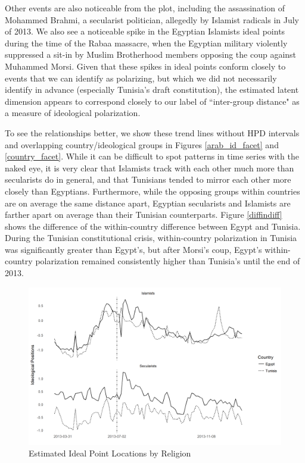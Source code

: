 \documentclass[12pt]{article}
\begin{document}
Other events are also noticeable from the plot, including the assassination of Mohammed Brahmi, a secularist politician, allegedly by Islamist radicals in July of 2013. We also see a noticeable spike in the Egyptian Islamists ideal points during the time of the Rabaa massacre, when the Egyptian military violently suppressed a sit-in by Muslim Brotherhood members opposing the coup against Muhammed Morsi. Given that these spikes in ideal points conform closely to events that we can identify as polarizing, but which we did not necessarily  identify in advance (especially Tunisia's draft constitution), the estimated latent dimension appears to correspond closely to our label of ``inter-group distance" as a measure of ideological polarization.

 To see the relationships better, we show these trend lines without HPD intervals and overlapping country/ideological groups in Figures \ref{arab_id_facet} and \ref{country_facet}. While it can be difficult to spot patterns in time series with the naked eye, it is very clear that Islamists track with each other much more than secularists do in general, and that Tunisians tended to mirror each other more closely than Egyptians. Furthermore, while the opposing groups within countries are on average the same distance apart, Egyptian secularists and Islamists are farther apart on average than their Tunisian counterparts. Figure \ref{diffindiff} shows the difference of the within-country difference between Egypt and Tunisia. During the Tunisian constitutional crisis, within-country polarization in Tunisia was significantly greater than Egypt's, but after Morsi's coup, Egypt's within-country polarization remained consistently higher than Tunisia's until the end of 2013.
 \begin{figure}[!h]
 	\centering
	\caption{Estimated Ideal Point Locations by Religion}\label{religion_facet}
	\centering
	\includegraphics[width=.9\linewidth]{religion_coint}
\end{figure}
\end{document}
